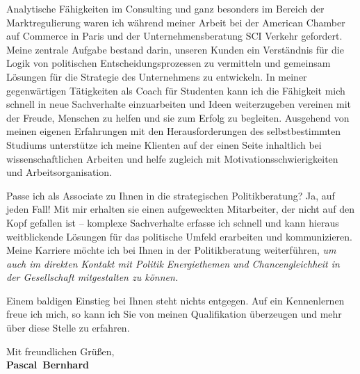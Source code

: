 \documentclass[11pt,a4paper]{article}
\def\firstname{Pascal}
\def\familyname{Bernhard}
\begin{document}
Analytische Fähigkeiten im Consulting und ganz besonders im Bereich der Marktregulierung waren ich während meiner Arbeit bei der American Chamber auf Commerce in Paris und der Unternehmensberatung SCI Verkehr gefordert. Meine zentrale Aufgabe bestand darin, unseren Kunden ein Verständnis für die Logik von politischen Entscheidungsprozessen zu vermitteln und gemeinsam Lösungen für die Strategie des Unternehmens zu entwickeln. In meiner gegenwärtigen Tätigkeiten als Coach für Studenten kann ich die Fähigkeit mich schnell in neue Sachverhalte einzuarbeiten und Ideen weiterzugeben vereinen mit der Freude, Menschen zu helfen und sie zum Erfolg zu begleiten. Ausgehend von meinen eigenen Erfahrungen mit den Herausforderungen des selbstbestimmten Studiums unterstütze ich meine Klienten auf der einen Seite inhaltlich bei wissenschaftlichen Arbeiten und helfe zugleich mit Motivationsschwierigkeiten und Arbeitsorganisation.

Passe ich als Associate zu Ihnen in die strategischen Politikberatung? Ja, auf jeden Fall! Mit mir erhalten sie einen aufgeweckten Mitarbeiter, der nicht auf den Kopf gefallen ist -- komplexe Sachverhalte erfasse ich schnell und kann hieraus weitblickende Lösungen für das politische Umfeld erarbeiten und kommunizieren. Meine Karriere möchte ich bei Ihnen in der Politikberatung weiterführen, \textsl{um auch im direkten Kontakt mit Politik Energiethemen und Chancengleichheit in der Gesellschaft mitgestalten zu können.}

Einem baldigen Einstieg bei Ihnen steht nichts entgegen. Auf ein Kennenlernen freue ich mich, so kann ich Sie von meinen Qualifikation überzeugen und mehr über diese Stelle zu erfahren.


Mit freundlichen Grüßen,\\[2em] 
%
{\bfseries \firstname~\familyname}\\
%
\end{document}
